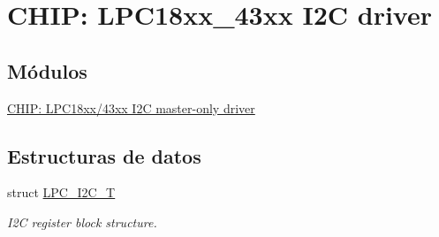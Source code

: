 \hypertarget{group___i2_c__18_x_x__43_x_x}{}\section{C\+H\+IP\+: L\+P\+C18xx\+\_\+43xx I2C driver}
\label{group___i2_c__18_x_x__43_x_x}
\subsection*{Módulos}
\begin{DoxyCompactItemize}
\item 
\hyperlink{group___i2_c_m__18_x_x__43_x_x}{C\+H\+I\+P\+: L\+P\+C18xx/43xx I2\+C master-\/only driver}
\end{DoxyCompactItemize}
\subsection*{Estructuras de datos}
\begin{DoxyCompactItemize}
\item 
struct \hyperlink{struct_l_p_c___i2_c___t}{L\+P\+C\+\_\+\+I2\+C\+\_\+T}
\begin{DoxyCompactList}\small\item\em I2C register block structure. \end{DoxyCompactList}\end{DoxyCompactItemize}
